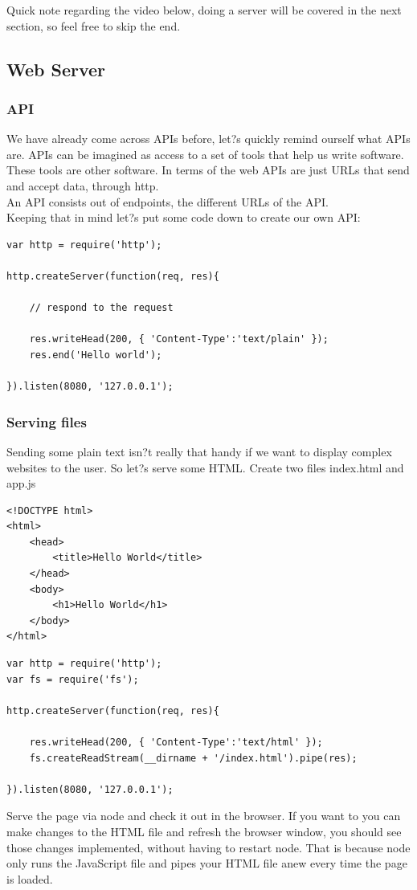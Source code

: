 \documentclass[a4paper]{article}
\begin{document}
Quick note regarding the video below, doing a server will be covered in the next section, so feel free to skip the end.
\subsection{Web Server}
\subsubsection{API}
We have already come across APIs before, let?s quickly remind ourself what APIs are. APIs can be imagined as access to a set of tools that help us write software. These tools are other software. In terms of the web APIs are just URLs that send and accept data, through http.\\

An API consists out of endpoints, the different URLs of the API.\\

Keeping that in mind let?s put some code down to create our own API:\\
\begin{lstlisting}
var http = require('http');

http.createServer(function(req, res){

    // respond to the request

    res.writeHead(200, { 'Content-Type':'text/plain' });
    res.end('Hello world');

}).listen(8080, '127.0.0.1');
\end{lstlisting}


\subsubsection{Serving files}
Sending some plain text isn?t really that handy if we want to display complex websites to the user. So let?s serve some HTML. Create two files index.html and app.js
\begin{lstlisting}
<!DOCTYPE html>
<html>
    <head>
        <title>Hello World</title>
    </head>
    <body>
        <h1>Hello World</h1>
    </body>
</html>
\end{lstlisting}
\begin{lstlisting}
var http = require('http');
var fs = require('fs');

http.createServer(function(req, res){

    res.writeHead(200, { 'Content-Type':'text/html' });
    fs.createReadStream(__dirname + '/index.html').pipe(res);

}).listen(8080, '127.0.0.1');
\end{lstlisting}
Serve the page via node and check it out in the browser. If you want to you can make changes to the HTML file and refresh the browser window, you should see those changes implemented, without having to restart node. That is because node only runs the JavaScript file and pipes your HTML file anew every time the page is loaded.
\end{document}
